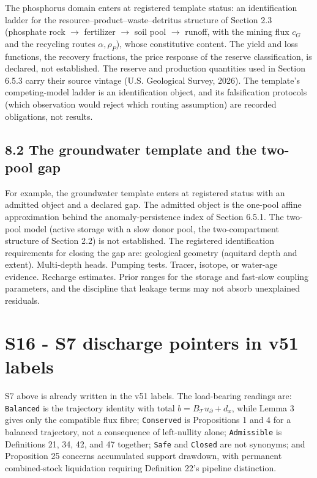 \documentclass[11pt]{article}
\begin{document}
The phosphorus domain enters at registered template status: an identification ladder for the resource--product--waste--detritus structure of Section 2.3 (phosphate rock \(\rightarrow\) fertilizer \(\rightarrow\) soil pool \(\rightarrow\) runoff, with the mining flux \(c_G\) and the recycling routes \(\alpha, \rho_P\)), whose constitutive content. The yield and loss functions, the recovery fractions, the price response of the reserve classification, is declared, not established. The reserve and production quantities used in Section 6.5.3 carry their source vintage (U.S. Geological Survey, 2026). The template's competing-model ladder is an identification object, and its falsification protocols (which observation would reject which routing assumption) are recorded obligations, not results.

\subsection*{8.2 The groundwater template and the two-pool gap}\label{82-the-groundwater-template-and-the-two-pool-gap}

For example, the groundwater template enters at registered status with an admitted object and a declared gap. The admitted object is the one-pool affine approximation behind the anomaly-persistence index of Section 6.5.1. The two-pool model (active storage with a slow donor pool, the two-compartment structure of Section 2.2) is not established. The registered identification requirements for closing the gap are: geological geometry (aquitard depth and extent). Multi-depth heads. Pumping tests. Tracer, isotope, or water-age evidence. Recharge estimates. Prior ranges for the storage and fast-slow coupling parameters, and the discipline that leakage terms may not absorb unexplained residuals.

\section*{S16 - S7 discharge pointers in v51 labels}\label{s16---s7-discharge-pointers-in-v51-labels}

S7 above is already written in the v51 labels. The load-bearing readings are: \texttt{Balanced} is the trajectory identity with total \(b=B_{\mathcal T}u_\partial+d_x\), while Lemma 3 gives only the compatible flux fibre; \texttt{Conserved} is Propositions 1 and 4 for a balanced trajectory, not a consequence of left-nullity alone; \texttt{Admissible} is Definitions 21, 34, 42, and 47 together; \texttt{Safe} and \texttt{Closed} are not synonyms; and Proposition 25 concerns accumulated support drawdown, with permanent combined-stock liquidation requiring Definition 22's pipeline distinction.
\end{document}
